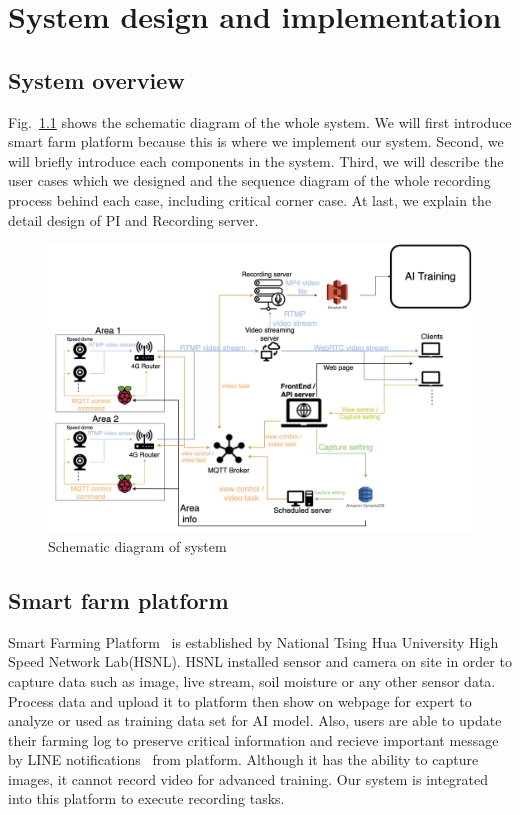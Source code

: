 \chapter{System design and implementation}
\label{c:system-design-and-implementation}


\graphicspath{{./figsrc/}}
\fi

\section{System overview}
Fig.~\ref{fig:big-system} shows the schematic diagram of the whole system. We will first introduce smart farm platform because this is where we implement our system. Second, we will briefly introduce each components in the system. Third, we will describe the user cases which we designed and the sequence diagram of the whole recording process behind each case, including critical corner case. At last, we explain the detail design of PI and Recording server.

\begin{figure}[H]
    \centering
    \includegraphics[width=\textwidth]{figsrc/big-system.png}
    \caption{Schematic diagram of system\label{fig:big-system}}
\end{figure}

\section{Smart farm platform}
Smart Farming Platform~\cite{agri-web} is established by National Tsing Hua University High Speed Network Lab(HSNL). HSNL installed sensor and camera on site in order to capture data such as image, live stream, soil moisture or any other sensor data. Process data and upload it to platform then show on webpage for expert to analyze or used as training data set for AI model. Also, users are able to update their farming log to preserve critical information and recieve important message by LINE notifications~\cite{line-notify} from platform. Although it has the ability to capture images, it cannot record video for advanced training. Our system is integrated into this platform to execute recording tasks.

